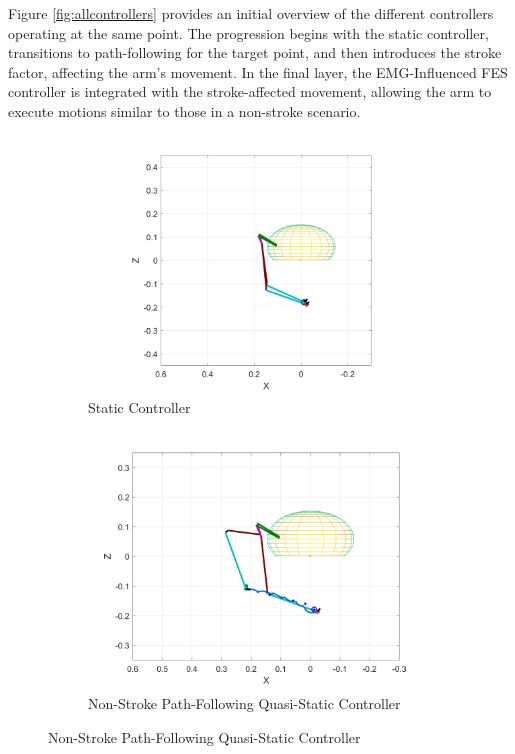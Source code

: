 Figure \ref{fig:allcontrollers} provides an initial overview of the different controllers operating at the same point. The progression begins with the static controller, transitions to path-following for the target point, and then introduces the stroke factor, affecting the arm's movement. In the final layer, the EMG-Influenced FES controller is integrated with the stroke-affected movement, allowing the arm to execute motions similar to those in a non-stroke scenario.

\begin{figure}[ht]
    \centering

    \begin{subfigure}[b]{0.5\textwidth}
        \includegraphics[width=0.75\linewidth]{Pictures/Controller/StaticControl_WP.png}
        \caption{Static Controller                                   }
    \end{subfigure}%
    \hfill
    \begin{subfigure}[b]{0.5\textwidth}
        \includegraphics[width=0.75\linewidth]{Pictures/Controller/Healthy_WP.png}
        \caption{Non-Stroke Path-Following Quasi-Static Controller}
    \end{subfigure}


\end{figure}
